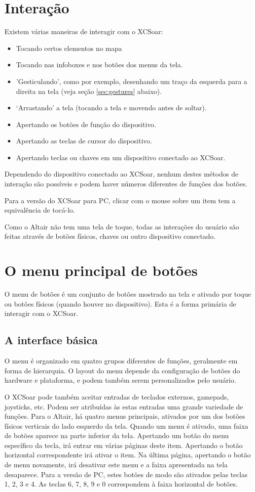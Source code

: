 \section{Interação}
Existem várias maneiras de interagir com o XCSoar:
\begin{itemize}
\item Tocando certos elementos no mapa
\item Tocando nas infoboxes e nos botões dos menus da tela.
\item 'Gesticulando', como por exemplo, desenhando um traço da esquerda para a direita na tela (veja seção   \ref{sec:gestures} abaixo).
\item ‘Arrastando’ a tela (tocando a tela e movendo antes de soltar).
\item Apertando os botões de função do dispositivo.
\item Apertando as teclas de cursor do dispositivo.
\item Apertando teclas ou chaves em um dispositivo conectado ao XCSoar.
\end{itemize}

Dependendo do dispositivo conectado ao XCSoar, nenhum destes métodos de interação são possíveis e podem haver números diferentes de funções dos botões.

Para a versão do XCSoar para PC, clicar com o mouse sobre um item tem a equivalência de tocá-lo.

Como o Altair não tem uma tela de toque, todas as interações do usuário são feitas através de botões físicos, chaves ou outro dispositivo conectado.  


\section{O menu principal de botões}
O menu de botões é um conjunto de botões mostrado na tela e ativado por toque ou botões físicos (quando houver no dispositivo).  Esta é a forma primária de interagir com o XCSoar.

\subsection*{A interface básica}
O menu é organizado em quatro grupos diferentes de funções, geralmente em forma de hierarquia.  O layout do menu depende da configuração de botões do hardware e plataforma, e podem também serem personalizados pelo usuário.

O XCSoar pode também aceitar entradas de teclados externos, gamepads, joysticks, etc.  Podem ser atribuídas às estas entradas uma grande variedade de funções.
Para o Altair, há quatro menus principais, ativados por um dos botões físicos verticais do lado esquerdo da tela.  Quando um menu é ativado, uma faixa de botões aparece na parte inferior da tela.  Apertando um botão do menu específico da tecla, irá entrar em várias páginas deste item.  Apertando o botão horizontal correspondente irá ativar o item.  Na última página, apertando o botão de menu novamente, irá desativar este menu e a faixa apresentada na tela desaparece.
Para a versão de PC, estes botões de modo são ativados pelas teclas 1, 2, 3 e 4.  As teclas 6, 7, 8, 9 e 0 correspondem à faixa horizontal de botões.

